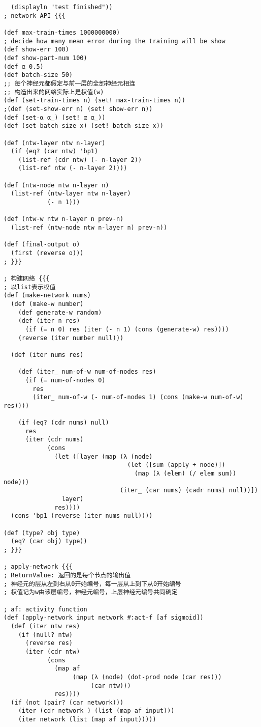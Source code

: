 \documentclass{article}
\begin{document}
\begin{lstlisting}
  (displayln "test finished"))
; network API {{{

(def max-train-times 1000000000)
; decide how many mean error during the training will be show
(def show-err 100) 
(def show-part-num 100)
(def α 0.5)
(def batch-size 50)
;; 每个神经元都假定与前一层的全部神经元相连
;; 构造出来的网络实际上是权值(w)
(def (set-train-times n) (set! max-train-times n))
;(def (set-show-err n) (set! show-err n))
(def (set-α α_) (set! α α_))
(def (set-batch-size x) (set! batch-size x))

(def (ntw-layer ntw n-layer)
  (if (eq? (car ntw) 'bp1)
    (list-ref (cdr ntw) (- n-layer 2))
    (list-ref ntw (- n-layer 2))))

(def (ntw-node ntw n-layer n)
  (list-ref (ntw-layer ntw n-layer)
            (- n 1)))

(def (ntw-w ntw n-layer n prev-n)
  (list-ref (ntw-node ntw n-layer n) prev-n))

(def (final-output o)
  (first (reverse o)))
; }}}

; 构建网络 {{{
; 以list表示权值
(def (make-network nums)
  (def (make-w number)
    (def generate-w random)
    (def (iter n res)
      (if (= n 0) res (iter (- n 1) (cons (generate-w) res))))
    (reverse (iter number null)))

  (def (iter nums res)

    (def (iter_ num-of-w num-of-nodes res)
      (if (= num-of-nodes 0)
        res
        (iter_ num-of-w (- num-of-nodes 1) (cons (make-w num-of-w) res))))

    (if (eq? (cdr nums) null)
      res
      (iter (cdr nums)
            (cons
              (let ([layer (map (λ (node)
                                  (let ([sum (apply + node)])
                                    (map (λ (elem) (/ elem sum)) node)))
                                (iter_ (car nums) (cadr nums) null))])
                layer)
              res))))
  (cons 'bp1 (reverse (iter nums null))))

(def (type? obj type)
  (eq? (car obj) type))
; }}}

; apply-network {{{
; ReturnValue: 返回的是每个节点的输出值
; 神经元的层从左到右从0开始编号，每一层从上到下从0开始编号
; 权值记为w由该层编号，神经元编号，上层神经元编号共同确定

; af: activity function
(def (apply-network input network #:act-f [af sigmoid])
  (def (iter ntw res)
    (if (null? ntw)
      (reverse res)
      (iter (cdr ntw)
            (cons
              (map af
                   (map (λ (node) (dot-prod node (car res)))
                        (car ntw)))
              res))))
  (if (not (pair? (car network)))
    (iter (cdr network ) (list (map af input)))
    (iter network (list (map af input)))))


\end{lstlisting}
\end{document}
